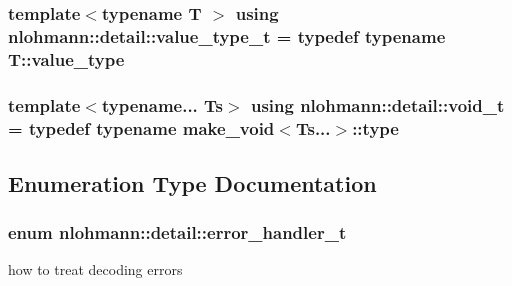 \subsubsection[{\texorpdfstring{value\+\_\+type\+\_\+t}{value_type_t}}]{\setlength{\rightskip}{0pt plus 5cm}template$<$typename T $>$ using {\bf nlohmann\+::detail\+::value\+\_\+type\+\_\+t} = typedef typename T\+::value\+\_\+type}\hypertarget{namespacenlohmann_1_1detail_af91beae90c2fb0f931079b3d50a343bc}{}\label{namespacenlohmann_1_1detail_af91beae90c2fb0f931079b3d50a343bc}
\subsubsection[{\texorpdfstring{void\+\_\+t}{void_t}}]{\setlength{\rightskip}{0pt plus 5cm}template$<$typename... Ts$>$ using {\bf nlohmann\+::detail\+::void\+\_\+t} = typedef typename {\bf make\+\_\+void}$<$Ts...$>$\+::type}\hypertarget{namespacenlohmann_1_1detail_a92a167c49c6697b6ffe4f79492c705e5}{}\label{namespacenlohmann_1_1detail_a92a167c49c6697b6ffe4f79492c705e5}


\subsection{Enumeration Type Documentation}
\subsubsection[{\texorpdfstring{error\+\_\+handler\+\_\+t}{error_handler_t}}]{\setlength{\rightskip}{0pt plus 5cm}enum {\bf nlohmann\+::detail\+::error\+\_\+handler\+\_\+t}\hspace{0.3cm}{\ttfamily [strong]}}\hypertarget{namespacenlohmann_1_1detail_a5a76b60b26dc8c47256a996d18d967df}{}\label{namespacenlohmann_1_1detail_a5a76b60b26dc8c47256a996d18d967df}


how to treat decoding errors 


